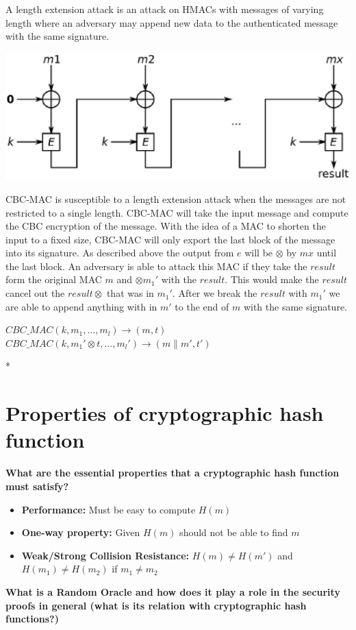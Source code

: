 \documentclass[letterpaper,11pt,notitlepage,fleqn]{article}
\begin{document}
A length extension attack is an attack on HMACs with messages of varying length where an adversary may append new data to the authenticated message with the same signature. 
\begin{center}
    \includegraphics{cbcmac.eps}\\[1cm] %
\end{center}
\indent CBC-MAC is susceptible to a length extension attack when the messages are not restricted to a single length. CBC-MAC will take the input message and compute the CBC encryption of the message. With the idea of a MAC to shorten the input to a fixed size, CBC-MAC will only export the last block of the message into its signature. As described above the output from $e$ will be $\otimes$ by $mx$ until the last block. An adversary is able to attack this MAC if they take the $result$ form
the original MAC $m$ and $\otimes m_{1}'$ with the $result$. This would make the $result$ cancel out the $result \otimes$ that was in $m_{1}'$. After we break the $result$ with $m_{1}'$ we are able to append anything with in $m'$ to the end of $m$ with the same signature.
\begin{center}
    $CBC\_MAC(k,m_{1},..., m_{l}) \rightarrow (m,t)$ \\ $CBC\_MAC(k,m_{1}' \otimes t, ..., m_{l}') \rightarrow (m\|m',t')$
\end{center}
*~\cite{cbc}
\section{Properties of cryptographic hash function}
\noindent \textbf{What are the essential properties that a cryptographic hash function must satisfy?}
\begin{itemize}
    \item \textbf{Performance:} Must be easy to compute $H(m)$
    \item \textbf{One-way property:} Given $H(m)$ should not be able to find $m$
    \item \textbf{Weak/Strong Collision Resistance:} $H(m) \neq H(m')$ and $H(m_{1}) \neq H(m_{2})$ if $m_{1} \neq m_{2}$
\end{itemize}
\noindent \textbf{What is a Random Oracle and how does it play a role in the security proofs in general 
(what is its relation with cryptographic hash functions?)}
\end{document}
